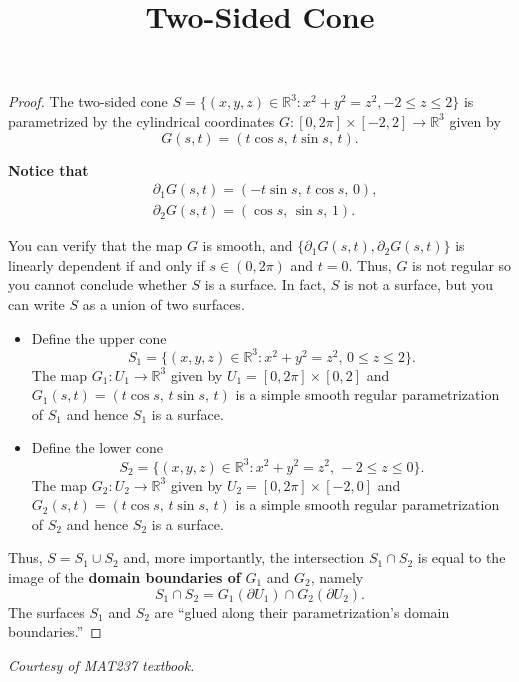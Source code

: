 \documentclass{article}
\title{Two-Sided Cone}
\author{}
\date{}
\begin{document}
\maketitle

\begin{proof}
The two-sided cone $S=\{(x,y,z)\in\mathbb{R}^3:x^2+y^2=z^2,-2\leq z\leq2\}$ is parametrized by the cylindrical coordinates $G:[0,2\pi]\times[-2,2]\to\mathbb{R}^3$ given by
$$G(s,t)=(t\cos s,\, t\sin s,\, t).$$

\textbf{Notice that}
$$\begin{aligned}
&\partial_1G(s,t)=(-t\sin s,\, t\cos s,\, 0),\\
&\partial_2G(s,t)=(\cos s,\, \sin s,\, 1).
\end{aligned}$$

You can verify that the map $G$ is smooth, and $\{\partial_1G(s,t),\partial_2G(s,t)\}$ is linearly dependent if and only if $s\in(0,2\pi)$ and $t=0$. Thus, $G$ is not regular so you cannot conclude whether $S$ is a surface. In fact, $S$ is not a surface, but you can write $S$ as a union of two surfaces.

\begin{itemize}
  \item Define the upper cone
  $$S_1=\{(x,y,z)\in\mathbb{R}^3:x^2+y^2=z^2,\, 0\leq z\leq2\}.$$
  The map $G_1:U_1\to\mathbb{R}^3$ given by $U_1=[0,2\pi]\times[0,2]$ and $G_1(s,t)=(t\cos s,\, t\sin s,\, t)$ is a simple smooth regular parametrization of $S_1$ and hence $S_1$ is a surface.

  \item Define the lower cone
  $$S_2=\{(x,y,z)\in\mathbb{R}^3:x^2+y^2=z^2,\, -2\leq z\leq0\}.$$
  The map $G_2:U_2\to\mathbb{R}^3$ given by $U_2=[0,2\pi]\times[-2,0]$ and $G_2(s,t)=(t\cos s,\, t\sin s,\, t)$ is a simple smooth regular parametrization of $S_2$ and hence $S_2$ is a surface.
\end{itemize}

Thus, $S=S_1\cup S_2$ and, more importantly, the intersection $S_1\cap S_2$ is equal to the image of the \textbf{domain boundaries of} $G_1$ and $G_2$, namely
$$S_1\cap S_2=G_1(\partial U_1)\cap G_2(\partial U_2).$$
The surfaces $S_1$ and $S_2$ are ``glued along their parametrization's domain boundaries.''
\end{proof}

{\small\textit{Courtesy of MAT237 textbook.}}
\end{document}

